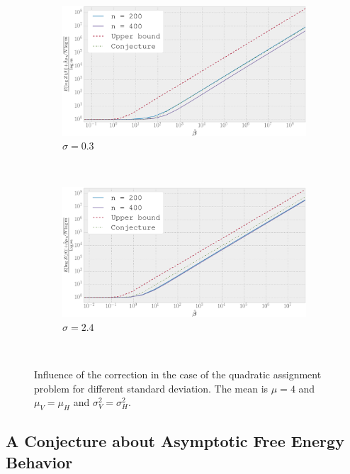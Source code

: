 \begin{figure}[ht!]
    \centering
    \begin{subfigure}[b]{.7\textwidth}
        \noindent\includegraphics[width=\textwidth]{figures/ch_free_energy/tr_qa_m4_std0-3_n200,400_iter10_rand25441_corr}
        \caption{$\sigma=0.3$}
        \label{fig:conjectured_for_qap_03}
    \end{subfigure}
    \\[.5cm]
    \begin{subfigure}[b]{.7\textwidth}
        \noindent\includegraphics[width=\textwidth]{figures/ch_free_energy/tr_qa_m4_std2-4_n200,400_iter10_rand30942_corr}
        \caption{$\sigma=2.4$}
        \label{fig:conjectured_for_qap_24}
    \end{subfigure}
    \\[.5cm]
    \caption{Influence of the correction in the case of the quadratic assignment problem for different standard deviation. The mean is $\mu=4$ and $\mu_V=\mu_H$ and $\sigma^2_V=\sigma^2_H$.}
    \label{fig:conjectured_for_qap}
\end{figure}

\subsection{A Conjecture about Asymptotic Free Energy Behavior}

